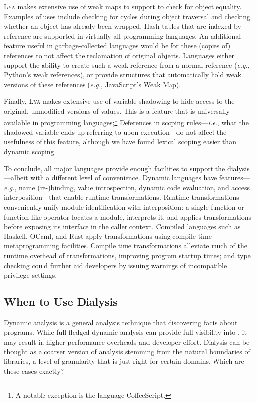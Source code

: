 \documentclass[letterpaper,twocolumn,10pt]{article}
\def\eg{{\em e.g.}, }
\def\ie{{\em i.e.}, }
\newcommand{\sys}{{\scshape Lya}\xspace}
\begin{document}
\sys makes extensive use of weak maps to support to check for object equality.
Examples of uses include checking for cycles during object traversal and checking whether an object has already been wrapped.
Hash tables that are indexed by reference are supported in virtually all programming languages.
An additional feature useful in garbage-collected languages would be for these (copies of) references to not affect the reclamation of original objects.
Languages either support the ability to create such a weak reference from a normal reference (\eg Python's weak references), or provide structures that automatically hold weak versions of these references (\eg JavaScript's Weak Map).

Finally, \sys makes extensive use of variable shadowing to hide access to the original, unmodified versions of values.
This is a feature that is universally available in programming languages;\footnote{
  A notable exception is the language CoffeeScript. %
}
Deferences in scoping rules---\ie what the shadowed variable ends up referring to upon execution---do not affect the usefulness of this feature, although we have found lexical scoping easier than dynamic scoping.

To conclude, all major languages provide enough facilities to support the dialysis---albeit with a different level of convenience.
Dynamic languages have features---\eg name (re-)binding, value introspection, dynamic code evaluation, and access interposition---that enable runtime transformations.
Runtime transformations conveniently unify module identification with interposition:
  a single function or function-like operator locates a module, interprets it, and applies transformations before exposing its interface in the caller context.
Compiled languages such as Haskell, OCaml, and Rust apply transformations using compile-time metaprogramming facilities.
Compile time transformations alleviate much of the runtime overhead of transformations, improving program startup times;
  and type checking could further aid developers by issuing warnings of incompatible privilege settings.


\subsection{When to Use Dialysis}
\label{principles}
Dynamic analysis is a general analysis technique that discovering facts about programs.
While full-fledged dynamic analysis can provide full visibility into , it may result in higher performance overheads and developer effort.
Dialysis can be thought as a coarser version of analysis stemming from the natural boundaries of libraries, a level of granularity that is just right for certain domains.
Which are these cases exactly?
\end{document}
